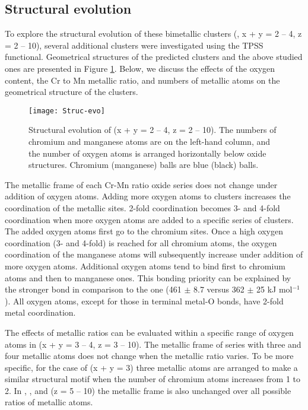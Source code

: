 \begin{refsection}
\FloatBarrier


\subsection{Structural evolution}

To explore the structural evolution of these bimetallic clusters (, x + y = 2 -- 4, z = 2 -- 10), several additional clusters were investigated using the TPSS functional. Geometrical structures of the predicted clusters and the above studied ones are presented in Figure \ref{fig:Struc-evo}. Below, we discuss the effects of the oxygen content, the Cr to Mn metallic ratio, and numbers of metallic atoms on the geometrical structure of the clusters.




\begin{figure}[!htb]
	\centering
	\texttt{[image: Struc-evo]}
	\caption{Structural evolution of  (x + y = 2 -- 4, z = 2 -- 10). The numbers of chromium and manganese atoms are on the left-hand column, and the number of oxygen atoms is arranged horizontally below oxide structures. Chromium (manganese) balls are blue (black) balls.}
	\label{fig:Struc-evo}
\end{figure}


The metallic frame of each Cr-Mn ratio oxide series does not change under addition of oxygen atoms. Adding more oxygen atoms to clusters increases the coordination of the metallic sites. 2-fold coordination becomes 3- and 4-fold coordination when more oxygen atoms are added to a specific series of clusters. The added oxygen atoms first go to the chromium sites. Once a high oxygen coordination (3- and 4-fold) is reached for all chromium atoms, the oxygen coordination of the manganese atoms will subsequently increase under addition of more oxygen atoms. Additional oxygen atoms tend to bind first to chromium atoms and then to manganese ones. This bonding priority can be explained by the stronger  bond in comparison to the  one (461 $\pm$ 8.7 versus 362 $\pm$ 25 kJ mol$^{-1}$ ). \cite{Luo-2007} All oxygen atoms, except for those in terminal metal-O bonds, have 2-fold metal coordination. 





The effects of metallic ratios can be evaluated within a specific range of oxygen atoms in  (x + y = 3 -- 4, z = 3 -- 10). The metallic frame of series with three and four metallic atoms does not change when the metallic ratio varies. To be more specific, for the case of  (x + y = 3) three metallic atoms are arranged to make a similar structural motif when the number of chromium atoms increases from 1 to 2. In , , and  (z = 5 -- 10) the metallic frame is also unchanged over all possible ratios of metallic atoms.  




\end{refsection}
